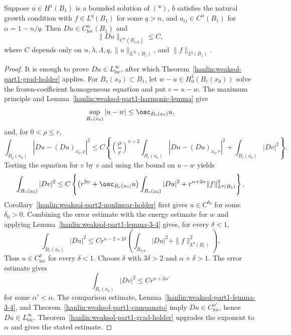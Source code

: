 \begin{theorem}\label{hanlin:weaksol-part2-nonlinear-gradient-holder}
Suppose $u\in H^1(B_1)$ is a bounded solution of $(\ast)$, $b$ satisfies
the natural growth condition with $f\in L^q(B_1)$ for some $q>n$, and
$a_{ij}\in C^\alpha(B_1)$ for $\alpha=1-n/q$. Then
$Du\in C^\alpha_{\mathrm{loc}}(B_1)$ and
\[
\|Du\|_{C^\alpha(B_{1/2})}\leq C,
\]
where $C$ depends only on
$n,\lambda,\Lambda,q,\|u\|_{L^\infty(B_1)}$, and
$\|f\|_{L^q(B_1)}$.
\end{theorem}
\begin{proof}
\sketch It is enough to prove $Du\in L^\infty_{\mathrm{loc}}$, after which
Theorem~\ref{hanlin:weaksol-part1-grad-holder} applies. For
$B_r(x_0)\subset B_1$, let
$w-u\in H^1_0(B_r(x_0))$ solve the frozen-coefficient homogeneous equation
and put $v=u-w$. The maximum principle and
Lemma~\ref{hanlin:weaksol-part1-harmonic-lemma} give
\begin{equation}
\sup_{B_r(x_0)}|u-w|\leq\osc_{B_r(x_0)}u,
\end{equation}
and, for $0<\rho\leq r$,
\begin{equation}
\int_{B_\rho(x_0)}|Du-(Du)_{x_0,\rho}|^2
\leq C\left\{
\left(\frac\rho r\right)^{n+2}
\int_{B_r(x_0)}|Du-(Du)_{x_0,r}|^2
+\int_{B_r(x_0)}|Dv|^2\right\}.
\end{equation}
Testing the equation for $v$ by $v$ and using the bound on $u-w$ yields
\begin{equation}
\int_{B_r(x_0)}|Dv|^2
\leq C\left\{
\bigl(r^{2\alpha}+\osc_{B_r(x_0)}u\bigr)
\int_{B_r(x_0)}|Du|^2
+r^{n+2\alpha}\|f\|_{L^q(B_1)}^2\right\}.
\end{equation}
Corollary~\ref{hanlin:weaksol-part2-nonlinear-holder} first gives
$u\in C^{\delta_0}$ for some $\delta_0>0$. Combining the error estimate
with the energy estimate for $w$ and applying
Lemma~\ref{hanlin:weaksol-part1-lemma-3-4} gives,
for every $\delta<1$,
\[
\int_{B_r(x_0)}|Du|^2
\leq Cr^{n-2+2\delta}
\left(\int_{B_{7/8}}|Du|^2+\|f\|_{L^q(B_1)}^2\right).
\]
Thus $u\in C^\delta_{\mathrm{loc}}$ for every $\delta<1$. Choose
$\delta$ with $3\delta>2$ and $\alpha+\delta>1$. The error estimate gives
\[
\int_{B_r(x_0)}|Dv|^2\leq Cr^{n+2\alpha'}
\]
for some $\alpha'<\alpha$. The comparison estimate,
Lemma~\ref{hanlin:weaksol-part1-lemma-3-4}, and
Theorem~\ref{hanlin:weaksol-part1-campanato} imply
$Du\in C^{\alpha'}_{\mathrm{loc}}$, hence
$Du\in L^\infty_{\mathrm{loc}}$.
Theorem~\ref{hanlin:weaksol-part1-grad-holder} upgrades the exponent to
$\alpha$ and gives the stated estimate.
\end{proof}
